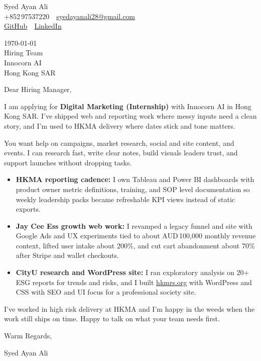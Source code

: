 \documentclass[11pt,a4paper]{article}
\begin{document}
\noindent
Syed Ayan Ali\\
+852\,97537220 \,\textbar\, \href{mailto:syedayanali28@gmail.com}{syedayanali28@gmail.com}\\
\href{https://github.com/syedayanali28}{GitHub} \,\textbar\, \href{https://www.linkedin.com/in/syedayanali/}{LinkedIn}

\vspace{1em}

\noindent
\today\\[0.8em]
Hiring Team\\
Innocorn AI\\
Hong Kong SAR

\vspace{1em}

Dear Hiring Manager,

I am applying for \textbf{Digital Marketing (Internship)} with Innocorn AI in Hong Kong SAR. I've shipped web and reporting work where messy inputs need a clean story, and I'm used to HKMA delivery where dates stick and tone matters.

You want help on campaigns, market research, social and site content, and events. I can research fast, write clear notes, build visuals leaders trust, and support launches without dropping tasks.

\begin{itemize}
\item \textbf{HKMA reporting cadence:} I own Tableau and Power BI dashboards with product owner metric definitions, training, and SOP level documentation so weekly leadership packs became refreshable KPI views instead of static exports.

\item \textbf{Jay Cee Ess growth web work:} I revamped a legacy funnel and site with Google Ads and UX experiments tied to about AUD\,100{,}000 monthly revenue context, lifted user intake about 200\%, and cut cart abandonment about 70\% after Stripe and wallet checkouts.

\item \textbf{CityU research and WordPress site:} I ran exploratory analysis on 20+ ESG reports for trends and risks, and I built \href{https://hkmrs.org}{hkmrs.org} with WordPress and CSS with SEO and UI focus for a professional society site.
\end{itemize}

I've worked in high risk delivery at HKMA and I'm happy in the weeds when the work still ships on time. Happy to talk on what your team needs first.

\vspace{1em}

Warm Regards,

\vspace{0.5em}

Syed Ayan Ali
\end{document}

